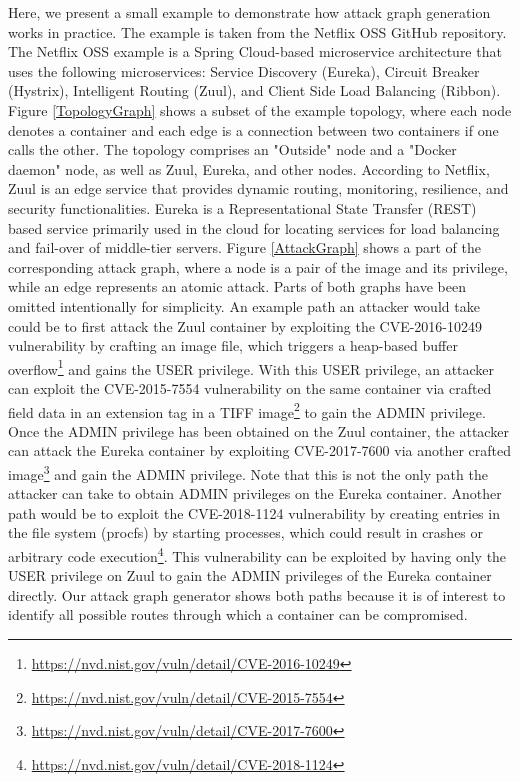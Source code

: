 Here, we present a small example to demonstrate how attack graph generation works in practice. The example is taken from the Netflix OSS GitHub repository. The Netflix OSS example is a Spring Cloud-based microservice architecture that uses the following microservices: Service Discovery (Eureka), Circuit Breaker (Hystrix), Intelligent Routing (Zuul), and Client Side Load Balancing (Ribbon). Figure \ref{TopologyGraph} shows a subset of the example topology, where each node denotes a container and each edge is a connection between two containers if one calls the other. The topology comprises an "Outside" node and a "Docker daemon" node, as well as Zuul, Eureka, and other nodes. According to Netflix, Zuul is an edge service that provides dynamic routing, monitoring, resilience, and security functionalities. Eureka is a Representational State Transfer (REST) based service primarily used in the cloud for locating services for load balancing and fail-over of middle-tier servers. Figure \ref{AttackGraph} shows a part of the corresponding attack graph, where a node is a pair of the image and its privilege, while an edge represents an atomic attack. Parts of both graphs have been omitted intentionally for simplicity. An example path an attacker would take could be to first attack the Zuul container by exploiting the CVE-2016-10249 vulnerability by crafting an image file, which triggers a heap-based buffer overflow\footnote{\url{https://nvd.nist.gov/vuln/detail/CVE-2016-10249}} and gains the USER privilege.  With this USER privilege, an attacker can exploit the CVE-2015-7554 vulnerability on the same container via crafted field data in an extension tag in a TIFF image\footnote{\url{https://nvd.nist.gov/vuln/detail/CVE-2015-7554}} to gain the ADMIN privilege. Once the ADMIN privilege has been obtained on the Zuul container, the attacker can attack the Eureka container by exploiting CVE-2017-7600 via another crafted image\footnote{\url{https://nvd.nist.gov/vuln/detail/CVE-2017-7600}} and gain the ADMIN privilege. Note that this is not the only path the attacker can take to obtain ADMIN privileges on the Eureka container. Another path would be to exploit the CVE-2018-1124 vulnerability by creating entries in the file system (procfs) by starting processes, which could result in crashes or arbitrary code execution\footnote{\url{https://nvd.nist.gov/vuln/detail/CVE-2018-1124}}. This vulnerability can be exploited by having only the USER privilege on Zuul to gain the ADMIN privileges of the Eureka container directly. Our attack graph generator shows both paths because it is of interest to identify all possible routes through which a container can be compromised.



